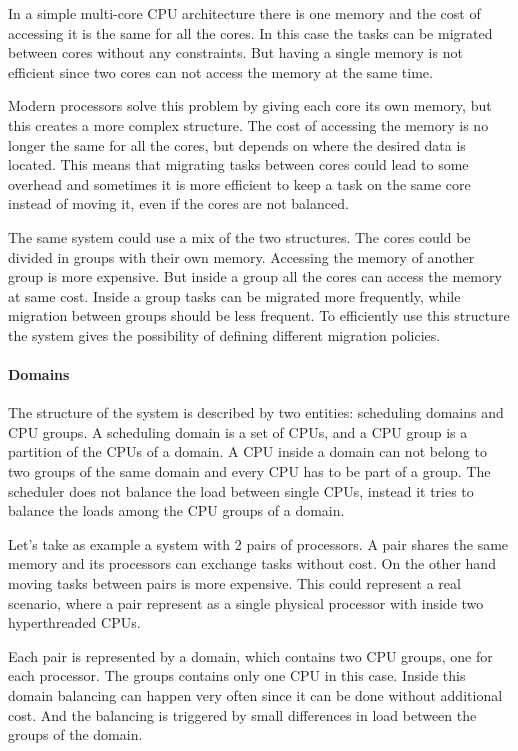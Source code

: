 In a simple multi-core CPU architecture there is one memory and the cost of accessing it is the same for all the cores. In this case the tasks can be migrated between cores without any constraints. But having a single memory is not efficient since two cores can not access the memory at the same time. 

Modern processors solve this problem by giving each core its own memory, but this creates a more complex structure. The cost of accessing the memory is no longer the same for all the cores, but depends on where the desired data is located. This means that migrating tasks between cores could lead to some overhead and sometimes it is more efficient to keep a task on the same core instead of moving it, even if the cores are not balanced. 

The same system could use a mix of the two structures. The cores could be divided in groups with their own memory. Accessing the memory of another group is more expensive. But inside a group all the cores can access the memory at same cost. Inside a group tasks can be migrated more frequently, while migration between groups should be less frequent. To efficiently use this structure the system gives the possibility of defining different migration policies.

\paragraph{Domains}
The structure of the system is described by two entities: scheduling domains and CPU groups. A scheduling domain is a set of CPUs, and a CPU group is a partition of the CPUs of a domain. A CPU inside a domain can not belong to two groups of the same domain and every CPU has to be part of a group. The scheduler does not balance the load between single CPUs, instead it tries to balance the loads among the CPU groups of a domain.

Let's take as example a system with 2 pairs of processors. A pair shares the same memory and its processors can exchange tasks without cost. On the other hand moving tasks between pairs is more expensive. This could represent a real scenario, where a pair represent as a single physical processor with inside two hyperthreaded CPUs.

Each pair is represented by a domain, which contains two CPU groups, one for each processor. The groups contains only one CPU in this case. Inside this domain balancing can happen very often since it can be done without additional cost. And the balancing is triggered by small differences in load between the groups of the domain.

